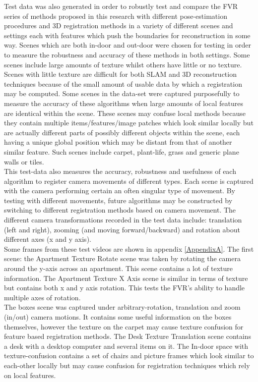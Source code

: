 Test data was also generated in order to robustly test and compare the FVR series of methods proposed in this research with different pose-estimation procedures and 3D registration methods in a variety of different scenes and settings each with features which push the boundaries for reconstruction in some way. Scenes which are both in-door and out-door were chosen for testing in order to measure the robustness and accuracy of these methods in both settings. Some scenes include large amounts of texture whilst others have little or no texture. Scenes with little texture are difficult for both SLAM and 3D reconstruction techniques because of the small amount of usable data by which a registration may be computed. Some scenes in the data-set were captured purposefully to measure the accuracy of these algorithms when large amounts of local features are identical within the scene. These scenes may confuse local methods because they contain multiple items/features/image patches which look similar locally but are actually different parts of possibly different objects within the scene, each having a unique global position which may be distant from that of another similar feature. Such scenes include carpet, plant-life, grass and generic plane walls or tiles. \\

This test-data also measures the accuracy, robustness and usefulness of each algorithm to register camera movements of different types. Each scene is captured with the camera performing certain an often singular type of movement. By testing with different movements, future algorithms may be constructed by switching to different registration methods based on camera movement. The different camera transformations recorded in the test data include: translation (left and right), zooming (and moving forward/backward) and rotation about different axes (x and y axis). \\

Some frames from these test videos are shown in appendix \ref{AppendixA}. The first scene: the Apartment Texture Rotate scene was taken by rotating the camera around the y-axis across an apartment. This scene contains a lot of texture information. The Apartment Texture X Axis scene is similar in terms of texture but contains both x and y axis rotation. This tests the FVR's ability to handle multiple axes of rotation. \\


The boxes scene was captured under arbitrary-rotation, translation and zoom (in/out) camera motions. It contains some useful information on the boxes themselves, however the texture on the carpet may cause texture confusion for feature based registration methods. The Desk Texture Translation scene contains a desk with a desktop computer and several items on it. The In-door space with texture-confusion contains a set of chairs and picture frames which look similar to each-other locally but may cause confusion for registration techniques which rely on local features. \\

